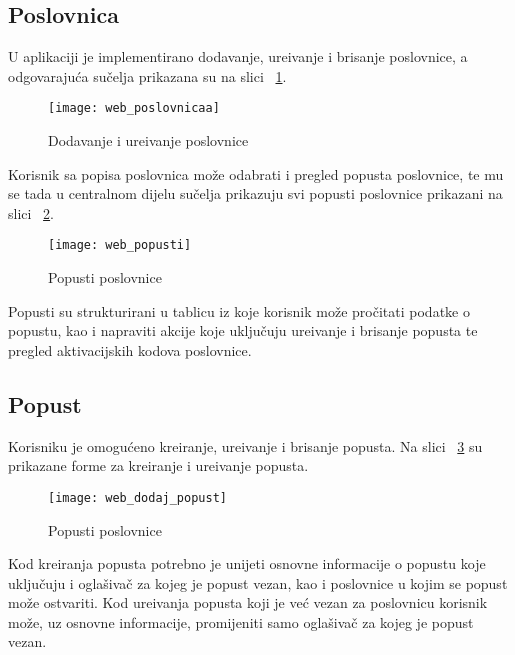 \subsection{Poslovnica}

U aplikaciji je implementirano dodavanje, ure\dj ivanje i brisanje poslovnice, a odgovaraju\'{c}a su\v{c}elja prikazana su na slici ~\ref{fig:web_poslovnicaa}.

\begin{figure}[!htbp]
	\begin{center}
 \texttt{[image: web\_poslovnicaa]}
 \caption{Dodavanje i ure\dj ivanje poslovnice}
 \label{fig:web_poslovnicaa}
	\end{center}
\end{figure}

Korisnik sa popisa poslovnica mo\v{z}e odabrati i pregled popusta poslovnice, te mu se tada u centralnom dijelu su\v{c}elja prikazuju svi popusti poslovnice prikazani na slici ~\ref{fig:web_popusti}.

\begin{figure}[!htbp]
	\begin{center}
 \texttt{[image: web\_popusti]}
 \caption{Popusti poslovnice}
 \label{fig:web_popusti}
	\end{center}
\end{figure}

Popusti su strukturirani u tablicu iz koje korisnik mo\v{z}e pro\v{c}itati podatke o popustu, kao i napraviti akcije koje uklju\v{c}uju ure\dj ivanje i brisanje popusta te pregled aktivacijskih kodova poslovnice.


\subsection{Popust}

Korisniku je omogu\'{c}eno kreiranje, ure\dj ivanje i brisanje popusta. Na slici ~\ref{fig:web_dodaj_popust} su prikazane forme za kreiranje i ure\dj ivanje popusta.

\begin{figure}[!htbp]
	\begin{center}
 \texttt{[image: web\_dodaj\_popust]}
 \caption{Popusti poslovnice}
 \label{fig:web_dodaj_popust}
	\end{center}
\end{figure}
Kod kreiranja popusta potrebno je unijeti osnovne informacije o popustu koje uklju\v{c}uju i ogla\v{s}iva\v{c} za kojeg je popust vezan, kao i poslovnice u kojim se popust mo\v{z}e ostvariti. Kod ure\dj ivanja popusta koji je ve\'{c} vezan za poslovnicu korisnik mo\v{z}e, uz osnovne informacije, promijeniti samo ogla\v{s}iva\v{c} za kojeg je popust vezan.


